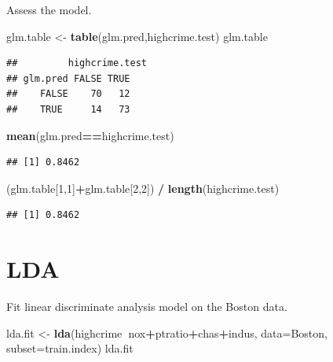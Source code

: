 \documentclass[
]{article}
\newenvironment{Shaded}{\begin{snugshade}}{\end{snugshade}}
\newcommand{\DataTypeTok}[1]{\textcolor[rgb]{0.13,0.29,0.53}{#1}}
\newcommand{\DecValTok}[1]{\textcolor[rgb]{0.00,0.00,0.81}{#1}}
\newcommand{\KeywordTok}[1]{\textcolor[rgb]{0.13,0.29,0.53}{\textbf{#1}}}
\newcommand{\NormalTok}[1]{#1}
\newcommand{\OperatorTok}[1]{\textcolor[rgb]{0.81,0.36,0.00}{\textbf{#1}}}
\newcommand{\StringTok}[1]{\textcolor[rgb]{0.31,0.60,0.02}{#1}}
\begin{document}
Assess the model.

\begin{Shaded}
\begin{Highlighting}[]
\NormalTok{glm.table <-}\StringTok{ }\KeywordTok{table}\NormalTok{(glm.pred,highcrime.test)}
\NormalTok{glm.table}
\end{Highlighting}
\end{Shaded}

\begin{verbatim}
##         highcrime.test
## glm.pred FALSE TRUE
##    FALSE    70   12
##    TRUE     14   73
\end{verbatim}

\begin{Shaded}
\begin{Highlighting}[]
\KeywordTok{mean}\NormalTok{(glm.pred}\OperatorTok{==}\NormalTok{highcrime.test)}
\end{Highlighting}
\end{Shaded}

\begin{verbatim}
## [1] 0.8462
\end{verbatim}

\begin{Shaded}
\begin{Highlighting}[]
\NormalTok{(glm.table[}\DecValTok{1}\NormalTok{,}\DecValTok{1}\NormalTok{]}\OperatorTok{+}\NormalTok{glm.table[}\DecValTok{2}\NormalTok{,}\DecValTok{2}\NormalTok{]) }\OperatorTok{/}\StringTok{ }\KeywordTok{length}\NormalTok{(highcrime.test)}
\end{Highlighting}
\end{Shaded}

\begin{verbatim}
## [1] 0.8462
\end{verbatim}

\hypertarget{lda}{%
\section{LDA}\label{lda}}

Fit linear discriminate analysis model on the Boston data.

\begin{Shaded}
\begin{Highlighting}[]
\NormalTok{lda.fit <-}\StringTok{ }\KeywordTok{lda}\NormalTok{(highcrime}\OperatorTok{~}\NormalTok{nox}\OperatorTok{+}\NormalTok{ptratio}\OperatorTok{+}\NormalTok{chas}\OperatorTok{+}\NormalTok{indus, }
               \DataTypeTok{data=}\NormalTok{Boston, }
               \DataTypeTok{subset=}\NormalTok{train.index)}
\NormalTok{lda.fit}
\end{Highlighting}
\end{Shaded}
\end{document}
